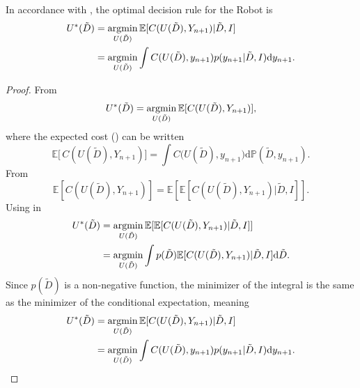\begin{theorem}
	\label{theorem:opt_decision_rule}
	In accordance with , the optimal decision rule for the Robot is
	\begin{equation}
		\begin{split}
			U^*(\tilde{D}) &= \operatorname*{argmin}_{U(\tilde{D})} \mathbb{E}[C(U(\tilde{D}), Y_{n+1})|\tilde{D},I]\\
			& = \operatorname*{argmin}_{U(\tilde{D})}\int  C(U(\tilde{D}),y_{n+1}) p(y_{n+1}|\tilde{D},I) \mathrm{d}y_{n+1}.
		\end{split}
		\label{eq:decision_rule3}
	\end{equation}
	
\end{theorem}
\begin{proof}
	From 
	\begin{equation}
		U^*(\tilde{D}) = \operatorname*{argmin}_{U(\tilde{D})} \mathbb{E}[C(U(\tilde{D}), Y_{n+1})],
		\label{eq:decision_rule_x}
	\end{equation}	
	where the expected cost () can be written
	\begin{equation}
			\mathbb{E}\big[\,C(U(\tilde{D}) ,Y_{n+1})\big]= \int C\big(U(\tilde{D}),y_{n+1}\big) \mathrm{d}\mathbb{P}(\tilde{D},y_{n+1}).
		\label{eq:conditional_expected_cost}
	\end{equation}
	From 
	\begin{equation}
		\mathbb{E}[C(U(\tilde{D}) , Y_{n+1})] = \mathbb{E}[\mathbb{E}[C(U(\tilde{D}) , Y_{n+1})|\tilde{D},I]].
		\label{eq:total2}
	\end{equation}
	Using  in 
	\begin{equation}
		\begin{split}
			U^*(\tilde{D}) &= \operatorname*{argmin}_{U(\tilde{D}) } \mathbb{E}[\mathbb{E}[C(U(\tilde{D}) , Y_{n+1})|\tilde{D},I]]\\
			&= \operatorname*{argmin}_{U(\tilde{D})} \int p(\tilde{D}) \mathbb{E}[C(U(\tilde{D}), Y_{n+1})|\tilde{D},I] \mathrm{d}\tilde{D}.
		\end{split}
		\label{eq:decision_rule2}
	\end{equation}
	Since $p(\tilde{D})$ is a non-negative function, the minimizer of the integral is the same as the minimizer of the conditional expectation, meaning
	\begin{equation}
		\begin{split}
			U^*(\tilde{D}) &= \operatorname*{argmin}_{U(\tilde{D})} \mathbb{E}[C(U(\tilde{D}), Y_{n+1})|\tilde{D},I]\\
			& = \operatorname*{argmin}_{U(\tilde{D})}\int  C(U(\tilde{D}),y_{n+1}) p(y_{n+1}|\tilde{D},I) \mathrm{d}y_{n+1}.
		\end{split}
	\end{equation}
\end{proof}

